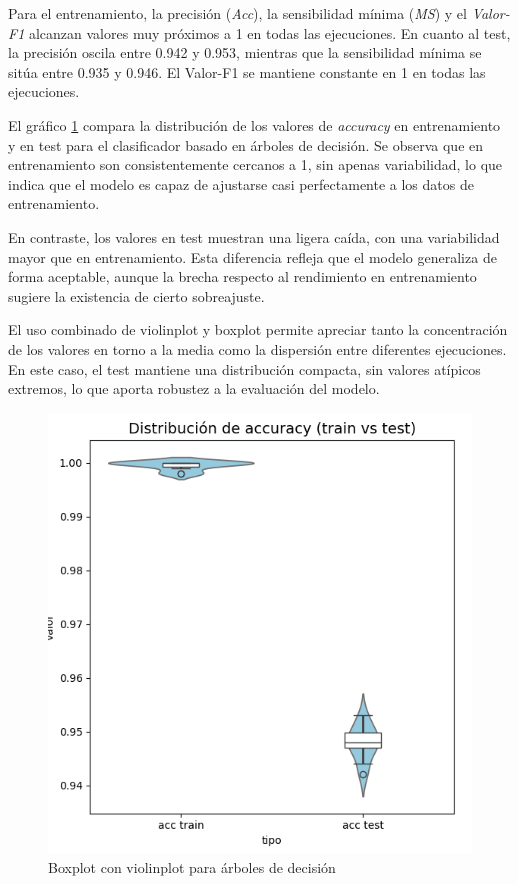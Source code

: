 Para el entrenamiento, la precisión (\textit{Acc}), la sensibilidad mínima (\textit{MS}) y el \textit{Valor-F1} alcanzan valores muy próximos a 1 en todas las ejecuciones. En cuanto al test, la precisión oscila entre 0.942 y 0.953, mientras que la sensibilidad mínima se sitúa entre 0.935 y 0.946. El Valor-F1 se mantiene constante en 1 en todas las ejecuciones.

\vspace{1em}

El gráfico \ref{fig:dt_bin} compara la distribución de los valores de \textit{accuracy} en entrenamiento y en test para el clasificador basado en árboles de decisión. Se observa que en entrenamiento son consistentemente cercanos a 1, sin apenas variabilidad, lo que indica que el modelo es capaz de ajustarse casi perfectamente a los datos de entrenamiento.

\vspace{1em}

En contraste, los valores en test muestran una ligera caída, con una variabilidad mayor que en entrenamiento. Esta diferencia refleja que el modelo generaliza de forma aceptable, aunque la brecha respecto al rendimiento en entrenamiento sugiere la existencia de cierto sobreajuste.

\vspace{1em}

El uso combinado de violinplot y boxplot permite apreciar tanto la concentración de los valores en torno a la media como la dispersión entre diferentes ejecuciones. En este caso, el test mantiene una distribución compacta, sin valores atípicos extremos, lo que aporta robustez a la evaluación del modelo.

\begin{figure}[H]
	\centering
	\includegraphics[width=1\linewidth]{Imagenes/dt_bin}
	\caption[Boxplot con violinplot para árboles de decisión]{Boxplot con violinplot para árboles de decisión}
	\label{fig:dt_bin}
\end{figure}

